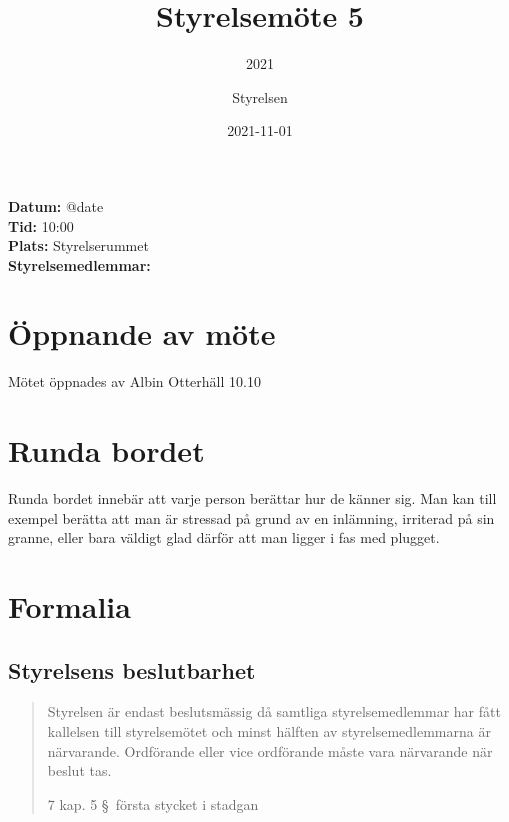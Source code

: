 \documentclass[protokoll]{dvd}
\begin{document}
\title{Styrelsemöte 5}
\subtitle{2021}
\author{Styrelsen}
\date{2021-11-01}

\textbf{Datum:} \csname @date\endcsname\\
\textbf{Tid:} 10:00\\
\textbf{Plats:} Styrelserummet\\
\textbf{Styrelsemedlemmar:}
\begin{närvarande_förtroendevalda}
\end{närvarande_förtroendevalda}







\section{Öppnande av möte}

Mötet öppnades av Albin Otterhäll 10.10






\section{Runda bordet}

Runda bordet innebär att varje person berättar hur de känner sig.
Man kan till exempel berätta att man är stressad på grund av en inlämning, irriterad på sin granne, eller bara väldigt glad därför att man ligger i fas med plugget.








\section{Formalia}

\subsection{Styrelsens beslutbarhet}

\blockquote[7 kap. 5 \S~första stycket i stadgan][]{%
    Styrelsen är endast beslutsmässig då samtliga styrelsemedlemmar har fått kallelsen till styrelsemötet och minst hälften av styrelsemedlemmarna är närvarande.
    Ordförande eller vice ordförande måste vara närvarande när beslut tas.
}
\end{document}

